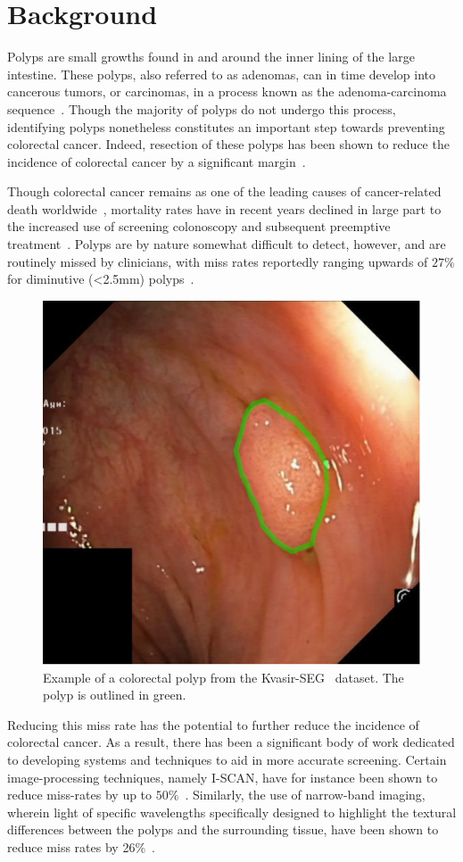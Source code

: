 \chapter{Background} \label{background}
Polyps are small growths found in and around the inner lining of the large intestine. These polyps, also referred to as adenomas, can in time develop into cancerous tumors, or carcinomas, in a process known as the adenoma-carcinoma sequence~\cite{ACS}. Though the majority of polyps do not undergo this process, identifying polyps nonetheless constitutes an important step towards preventing colorectal cancer. Indeed, resection of these polyps has been shown to reduce the incidence of colorectal cancer by a significant margin~\cite{resection}. 

Though colorectal cancer remains as one of the leading causes of cancer-related death worldwide~\cite{colorectal_cancer}, mortality rates have in recent years declined in large part to the increased use of screening colonoscopy and subsequent preemptive treatment~\cite{screening}. Polyps are by nature somewhat difficult to detect, however, and are routinely missed by clinicians, with miss rates reportedly ranging upwards of $27\%$ for diminutive (<2.5mm) polyps~\cite{missrate1, missrate2}.
\begin{figure}
    \centering
    \includegraphics[width=0.75\linewidth]{illustrations/polyp.png}
    \caption{Example of a colorectal polyp from the Kvasir-SEG~\cite{kvasir} dataset. The polyp is outlined in green.}
    \label{fig:polyp}
\end{figure}
Reducing this miss rate has the potential to further reduce the incidence of colorectal cancer. As a result, there has been a significant body of work dedicated to developing systems and techniques to aid in more accurate screening. Certain image-processing techniques, namely I-SCAN, have for instance been shown to reduce miss-rates by up to $50\%$~\cite{i-scan}. Similarly, the use of narrow-band imaging, wherein light of specific wavelengths specifically designed to highlight the textural differences between the polyps and the surrounding tissue, have been shown to reduce miss rates by 26\%~\cite{nbi}. 

